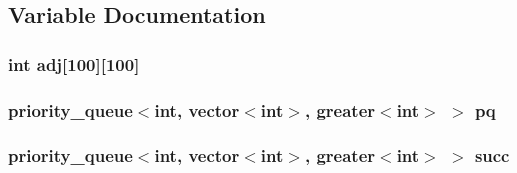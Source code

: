\subsection{\-Variable \-Documentation}
\hypertarget{PFD_8c_09_09_a5cc29cbda633cf803a14bc73ed26a902}{
\subsubsection[{adj}]{\setlength{\rightskip}{0pt plus 5cm}int {\bf adj}\mbox{[}100\mbox{]}\mbox{[}100\mbox{]}}}\label{PFD_8c_09_09_a5cc29cbda633cf803a14bc73ed26a902}
\hypertarget{PFD_8c_09_09_ab6bdd514724b32f635e208c56bdafe8d}{
\subsubsection[{pq}]{\setlength{\rightskip}{0pt plus 5cm}priority\-\_\-queue$<$int, vector$<$int$>$, greater$<$int$>$ $>$ {\bf pq}}}\label{PFD_8c_09_09_ab6bdd514724b32f635e208c56bdafe8d}
\hypertarget{PFD_8c_09_09_a528bc05abddf40ec8ae9b5c245e7282a}{
\subsubsection[{succ}]{\setlength{\rightskip}{0pt plus 5cm}priority\-\_\-queue$<$int, vector$<$int$>$, greater$<$int$>$ $>$ {\bf succ}}}\label{PFD_8c_09_09_a528bc05abddf40ec8ae9b5c245e7282a}
